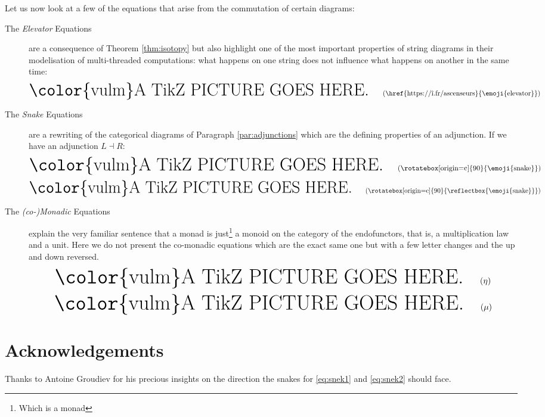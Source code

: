 \documentclass[math, english, info]{cours}
\makeatletter
\def\tikzimp@rt{0}
\def\inputtikz#1{
	\ifnum\tikzimp@rt=1
		
	\else
		\ensuremath{\text{\Huge\color{vulm}A TikZ PICTURE GOES HERE.}}
	\fi
}
\makeatother
\begin{document}
Let us now look at a few of the equations that arise from the commutation of certain diagrams:
\begin{description}
	\item[The \emph{Elevator} Equations] are a consequence of Theorem \ref{thm:isotopy} but also highlight one of the most important properties of string diagrams in their modelisation of multi-threaded computations: what happens on one string does not influence what happens on another in the same time:
	      \begin{equation}
			  \inputtikz{sd-elevator}
		      \label{eq:elevator}
			  \tag{\href{https://î.fr/ascenseurs}{\emoji{elevator}}}
	      \end{equation}

	\item[The \emph{Snake} Equations] are a rewriting of the categorical diagrams of Paragraph \ref{par:adjunctions} which are the defining properties of an adjunction.
		If we have an adjunction $L\dashv R$:
			      \begin{equation}
					  \inputtikz{sd-snake1}
					  \tag{\rotatebox[origin=c]{90}{\emoji{snake}}}
					  \label{eq:snek1}
			  \end{equation}
			  \vspace{-12pt}
			      \begin{equation}
					  \inputtikz{sd-snake2}
					  \tag{\rotatebox[origin=c]{90}{\reflectbox{\emoji{snake}}}}
					  \label{eq:snek2}
			  \end{equation}
		  \item[The \emph{(co-)Monadic} Equations] explain the very familiar sentence that a monad is just\footnote{Which is a monad} a monoid on the category of the endofunctors, that is, a multiplication law and a unit.
			  Here we do not present the co-monadic equations which are the exact same one but with a few letter changes and the up and down reversed.
			  \begin{equation}
				  \inputtikz{sd-monad-unit}
				  \label{eq:unitax}
				  \tag{$\eta$}
			  \end{equation}
			  \begin{equation}
				  \inputtikz{sd-monad-mult}
				  \label{eq:muax}
				  \tag{$\mu$}
			  \end{equation}
\end{description}


\section*{Acknowledgements}
Thanks to Antoine Groudiev for his precious insights on the direction the snakes for \eqref{eq:snek1} and \eqref{eq:snek2} should face.
\clearpage
\appendix
\end{document}
